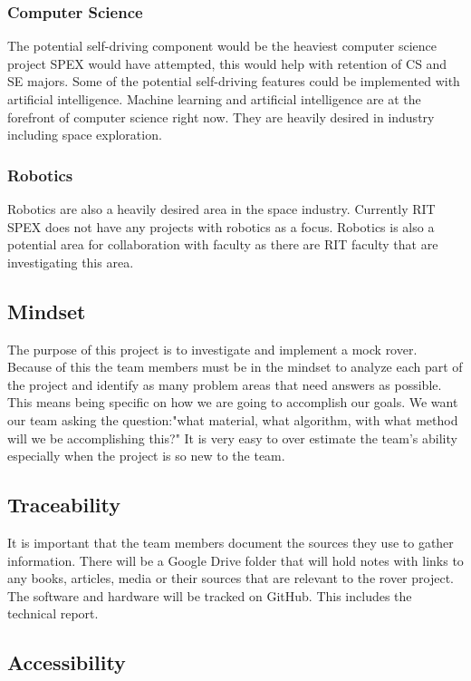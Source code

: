 \documentclass[conference]{IEEEtran} %
\begin{document}
\subsubsection{Computer Science}
The potential self-driving component would be the heaviest computer science project SPEX would have attempted, this would help with retention of CS and SE majors. 
Some of the potential self-driving features could be implemented with artificial intelligence.
Machine learning and artificial intelligence are at the forefront of computer science right now. 
They are heavily desired in industry including space exploration.
\subsubsection{Robotics}
\label{robotics}
Robotics are also a heavily desired area in the space industry. Currently RIT SPEX does not have any projects with robotics as a focus. Robotics is also a potential area for collaboration with faculty as there are RIT faculty that are investigating this area. 


\subsection{Mindset}
\label{subsec:mindset}
The purpose of this project is to investigate and implement a mock rover.
Because of this the team members must be in the mindset to analyze each part of the project and identify as many problem areas that need answers as possible. 
This means being specific on how we are going to accomplish our goals.
We want our team asking the question:"what material, what algorithm, with what method will we be accomplishing this?"
It is very easy to over estimate the team's ability especially when the project is so new to the team.

\subsection{Traceability}
\label{subsec:traceability}

It is important that the team members document the sources they use to gather information. 
There will be a Google Drive folder that will hold notes with links to any books, articles, media or their sources that are relevant to the rover project. 
The software and hardware will be tracked on GitHub. 
This includes the technical report.

\subsection{Accessibility}
\label{subsec:plug-n-play}
\end{document}
